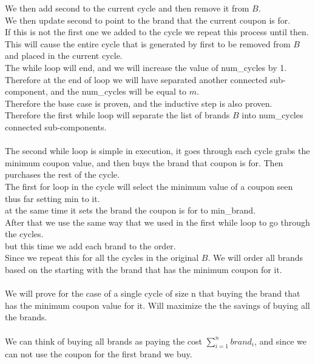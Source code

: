 \documentclass{article}
\begin{document}
      We then add second to the current cycle and then remove it from $B$.\\
      We then update second to point to the brand that the current coupon is for.\\
      If this is not the first one we added to the cycle we repeat this process until then.\\
      This will cause the entire cycle that is generated by first to be removed from $B$ and placed in the current cycle.\\
      The while loop will end, and we will increase the value of num\_cycles by 1.\\
      Therefore at the end of loop we will have separated another connected sub-component, and the num\_cycles will be equal to $m$.\\
      Therefore the base case is proven, and the inductive step is also proven.\\
      Therefore the first while loop will separate the list of brands $B$ into num\_cycles connected sub-components.\\
      \\
      The second while loop is simple in execution, it goes through each cycle grabs the minimum coupon value, and then buys the brand that coupon is for. 
      Then purchases the rest of the cycle.\\
      The first for loop in the cycle will select the minimum value of a coupon seen thus far setting min to it.\\
      at the same time it sets the brand the coupon is for to min\_brand.\\
      After that we use the same way that we used in the first while loop to go through the cycles.\\
      but this time we add each brand to the order.\\
      Since we repeat this for all the cycles in the original $B$. We will order all brands based on the starting with the brand that has the minimum coupon for it.\\
      \\
      We will prove for the case of a single cycle of size n that buying the brand that has the minimum coupon value for it. Will maximize the the savings of buying all the brands.\\
      \\
      We can think of buying all brands as paying the cost $\sum_{i = 1}^{n} brand_{i}$, and since we can not use the coupon for the first brand we buy.\\
\end{document}
